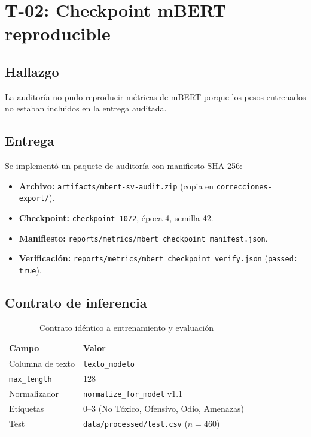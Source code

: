 \chapter{T-02: Checkpoint mBERT reproducible}

\section{Hallazgo}

La auditoría no pudo reproducir métricas de mBERT porque los pesos entrenados no estaban incluidos en la entrega auditada.

\section{Entrega}

Se implementó un paquete de auditoría con manifiesto SHA-256:

\begin{itemize}[noitemsep]
  \item \textbf{Archivo:} \texttt{artifacts/mbert-sv-audit.zip} (copia en \texttt{correcciones-export/}).
  \item \textbf{Checkpoint:} \texttt{checkpoint-1072}, época 4, semilla 42.
  \item \textbf{Manifiesto:} \texttt{reports/metrics/mbert\_checkpoint\_manifest.json}.
  \item \textbf{Verificación:} \texttt{reports/metrics/mbert\_checkpoint\_verify.json} (\texttt{passed: true}).
\end{itemize}

\section{Contrato de inferencia}

\begin{table}[H]
  \centering
  \caption{Contrato idéntico a entrenamiento y evaluación}
  \label{tab:inference-contract}
  \begin{tabular}{ll}
    \toprule
    Campo & Valor \\
    \midrule
    Columna de texto & \texttt{texto\_modelo} \\
    \texttt{max\_length} & 128 \\
    Normalizador & \texttt{normalize\_for\_model} v1.1 \\
    Etiquetas & 0--3 (No Tóxico, Ofensivo, Odio, Amenazas) \\
    Test & \texttt{data/processed/test.csv} ($n=460$) \\
    \bottomrule
  \end{tabular}
\end{table}


